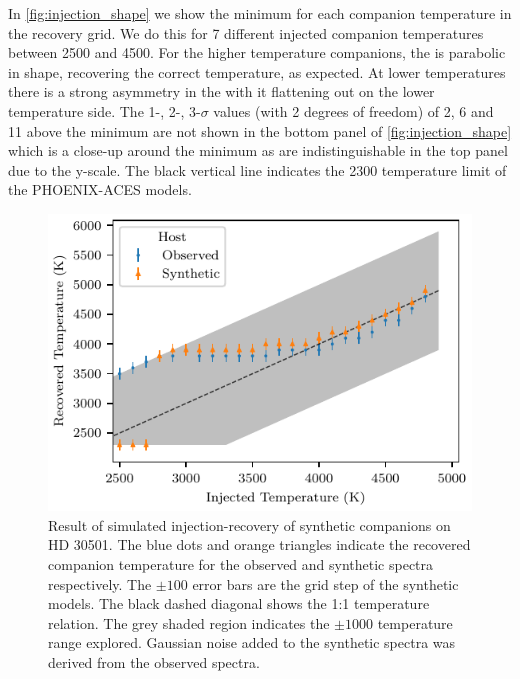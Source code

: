 In \cref{fig:injection_shape} we show the minimum \textchisquared{} for each companion temperature in the recovery grid.
We do this for 7 different injected companion temperatures between 2500 and 4500\K{}.
For the higher temperature companions, the \textchisquared{} is parabolic in shape, recovering the correct temperature, as expected.
At lower temperatures there is a strong asymmetry in the \textchisquared{} with it flattening out on the lower temperature side.
The 1-, 2-, 3-\(\sigma\) values (with 2 degrees of freedom) of 2, 6 and 11 above the minimum \textchisquared{} are not shown in the bottom panel of \cref{fig:injection_shape} which is a close-up around the minimum \textchisquared{} as are indistinguishable in the top panel due to the \textchisquared{} y-scale.
The black vertical line indicates the 2300\K{} temperature limit of the {PHOENIX-ACES} models.

\begin{figure}
    \centering
    \includegraphics[width=0.6\linewidth]{figures/companion_recovery/inject_recovery_hd30501.pdf}
    \caption[Result of simulated injection-recovery of synthetic companions on {HD 30501}.]{Result of simulated injection-recovery of synthetic companions on {HD 30501}.
    The blue dots and orange triangles indicate the recovered companion temperature for the observed and synthetic spectra respectively.
    The \(\pm100\)\K{} error bars are the grid step of the synthetic models.
    The black dashed diagonal shows the 1:1 temperature relation.
    The grey shaded region indicates the \(\pm1000\)\K{} temperature range explored.
    Gaussian noise added to the synthetic spectra was derived from the observed spectra.}
    \label{fig:injectrecoveryhd30501}
\end{figure}


